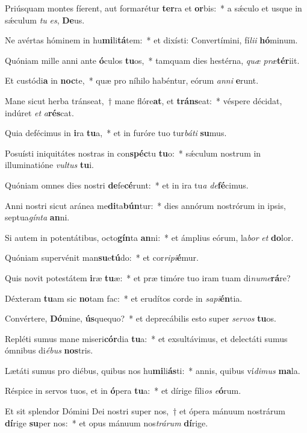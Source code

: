 \item Priúsquam montes fíerent, aut formarétur \textbf{ter}ra et \textbf{or}bis:~* a sǽculo et usque in sǽculum \textit{tu} \textit{es}, \textbf{De}us.
\item Ne avértas hóminem in hu\textbf{mi}li\textbf{tá}tem:~* et dixísti: Convertímini, fí\textit{li}\textit{i} \textbf{hó}minum.
\item Quóniam mille anni ante \textbf{ó}culos \textbf{tu}os,~* tamquam dies hestérna, \textit{quæ} \textit{præ}\textbf{tér}iit.
\item Et custódi\textbf{a} in \textbf{noc}te,~* quæ pro níhilo habéntur, eórum \textit{an}\textit{ni} \textbf{e}runt.
\item Mane sicut herba tránseat,~† mane flóre\textbf{at}, et \textbf{tráns}eat:~* véspere décidat, indúret \textit{et} \textit{a}\textbf{rés}cat.
\item Quia defécimus in \textbf{i}ra \textbf{tu}a,~* et in furóre tuo tur\textit{bá}\textit{ti} \textbf{su}mus.
\item Posuísti iniquitátes nostras in con\textbf{spéc}tu \textbf{tu}o:~* sǽculum nostrum in illuminatióne \textit{vul}\textit{tus} \textbf{tu}i.
\item Quóniam omnes dies nostri \textbf{de}fe\textbf{cé}runt:~* et in ira tu\textit{a} \textit{de}\textbf{fé}cimus.
\item Anni nostri sicut aránea me\textbf{di}ta\textbf{bún}tur:~* dies annórum nostrórum in ipsis, septua\textit{gín}\textit{ta} \textbf{an}ni.
\item Si autem in potentátibus, octo\textbf{gín}ta \textbf{an}ni:~* et ámplius eórum, la\textit{bor} \textit{et} \textbf{do}lor.
\item Quóniam supervénit man\textbf{su}e\textbf{tú}do:~* et cor\textit{ri}\textit{pi}\textbf{é}mur.
\item Quis novit potestátem \textbf{i}ræ \textbf{tu}æ:~* et præ timóre tuo iram tuam di\textit{nu}\textit{me}\textbf{rá}re?
\item Déxteram \textbf{tu}am sic \textbf{no}tam fac:~* et erudítos corde in \textit{sa}\textit{pi}\textbf{én}tia.
\item Convértere, \textbf{Dó}mine, \textbf{ús}quequo?~* et deprecábilis esto super \textit{ser}\textit{vos} \textbf{tu}os.
\item Repléti sumus mane miseri\textbf{cór}dia \textbf{tu}a:~* et exsultávimus, et delectáti sumus ómnibus di\textit{é}\textit{bus} \textbf{nos}tris.
\item Lætáti sumus pro diébus, quibus nos hu\textbf{mi}li\textbf{ás}ti:~* annis, quibus ví\textit{di}\textit{mus} \textbf{ma}la.
\item Réspice in servos tuos, et in \textbf{ó}pera \textbf{tu}a:~* et dírige fíli\textit{os} \textit{e}\textbf{ó}rum.
\item Et sit splendor Dómini Dei nostri super nos,~† et ópera mánuum nostrárum \textbf{dí}rige \textbf{su}per nos:~* et opus mánuum nos\textit{trá}\textit{rum} \textbf{dí}rige.
